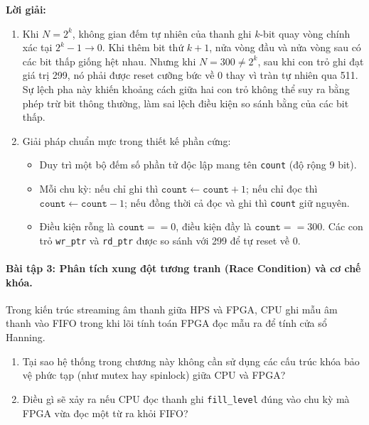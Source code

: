 \noindent\textbf{Lời giải:}
\begin{enumerate}[label=(\alph*), itemsep=2pt]
    \item Khi $N = 2^k$, không gian đếm tự nhiên của thanh ghi $k$-bit quay vòng chính xác tại $2^k - 1 \to 0$. Khi thêm bit thứ $k+1$, nửa vòng đầu và nửa vòng sau có các bit thấp giống hệt nhau. Nhưng khi $N = 300 \neq 2^k$, sau khi con trỏ ghi đạt giá trị 299, nó phải được reset cưỡng bức về 0 thay vì tràn tự nhiên qua 511. Sự lệch pha này khiến khoảng cách giữa hai con trỏ không thể suy ra bằng phép trừ bit thông thường, làm sai lệch điều kiện so sánh bằng của các bit thấp.
    \item Giải pháp chuẩn mực trong thiết kế phần cứng:
    \begin{itemize}[leftmargin=1.2em, itemsep=2pt]
        \item Duy trì một bộ đếm số phần tử độc lập mang tên \texttt{count} (độ rộng 9 bit).
        \item Mỗi chu kỳ: nếu chỉ ghi thì $\texttt{count} \leftarrow \texttt{count} + 1$; nếu chỉ đọc thì $\texttt{count} \leftarrow \texttt{count} - 1$; nếu đồng thời cả đọc và ghi thì \texttt{count} giữ nguyên.
        \item Điều kiện rỗng là $\texttt{count} == 0$, điều kiện đầy là $\texttt{count} == 300$. Các con trỏ \texttt{wr\_ptr} và \texttt{rd\_ptr} được so sánh với 299 để tự reset về 0.
    \end{itemize}
\end{enumerate}

\paragraph{Bài tập 3: Phân tích xung đột tương tranh (Race Condition) và cơ chế khóa.}
Trong kiến trúc streaming âm thanh giữa HPS và FPGA, CPU ghi mẫu âm thanh vào FIFO trong khi lõi tính toán FPGA đọc mẫu ra để tính cửa sổ Hanning.
\begin{enumerate}[label=(\alph*), itemsep=2pt]
    \item Tại sao hệ thống trong chương này không cần sử dụng các cấu trúc khóa bảo vệ phức tạp (như mutex hay spinlock) giữa CPU và FPGA?
    \item Điều gì sẽ xảy ra nếu CPU đọc thanh ghi \texttt{fill\_level} đúng vào chu kỳ mà FPGA vừa đọc một từ ra khỏi FIFO?
\end{enumerate}

